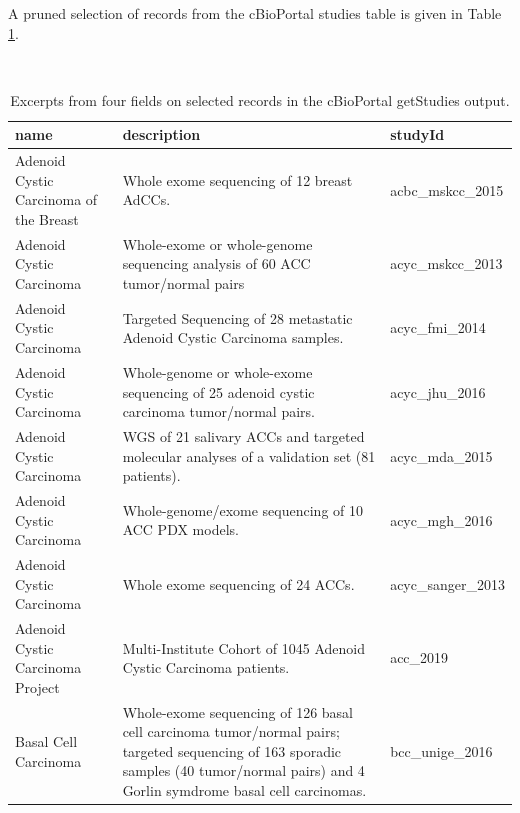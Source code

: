 A pruned selection of records from the cBioPortal
studies table is given in Table \ref{tab:tab-cball}.

\begin{table}
\caption{\label{tab:tab-cball}Excerpts from four fields on selected records in the cBioPortal getStudies output.}\\
\begin{tabular}{p{5cm}p{5cm}l}
name & description & studyId \\ \hline
Adenoid Cystic Carcinoma of the Breast & Whole exome sequencing of 12 breast AdCCs. & acbc\_mskcc\_2015 \\
Adenoid Cystic Carcinoma & Whole-exome or whole-genome sequencing analysis of 60 ACC tumor/normal pairs & acyc\_mskcc\_2013 \\
Adenoid Cystic Carcinoma & Targeted Sequencing of 28 metastatic Adenoid Cystic Carcinoma samples. & acyc\_fmi\_2014 \\
Adenoid Cystic Carcinoma & Whole-genome or whole-exome sequencing of 25 adenoid cystic carcinoma tumor/normal pairs. & acyc\_jhu\_2016 \\
Adenoid Cystic Carcinoma & WGS of 21 salivary ACCs and targeted molecular analyses of a validation set (81 patients). & acyc\_mda\_2015 \\
Adenoid Cystic Carcinoma & Whole-genome/exome sequencing of 10 ACC PDX models. & acyc\_mgh\_2016 \\
Adenoid Cystic Carcinoma & Whole exome sequencing of 24 ACCs. & acyc\_sanger\_2013 \\
Adenoid Cystic Carcinoma Project & Multi-Institute Cohort of 1045 Adenoid Cystic Carcinoma patients. & acc\_2019 \\
Basal Cell Carcinoma & Whole-exome sequencing of 126 basal cell carcinoma tumor/normal pairs; targeted sequencing of 163 sporadic samples (40 tumor/normal pairs) and 4 Gorlin symdrome basal cell carcinomas. & bcc\_unige\_2016 \\
\end{tabular}
\end{table}

